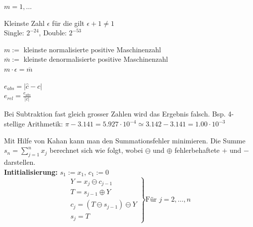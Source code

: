 \documentclass[a4paper,twocolumn]{article}
\begin{document}
	\begin{fdef}[normalisiert]
		$m = 1, \ldots$
	\end{fdef}
	
	\begin{fdef}[Maschinengenauigkeit]
		Kleinste Zahl $\epsilon$ für die gilt $\epsilon + 1 \ne 1$\\
		Single: $2^{-24}$, Double: $2^{-53}$
	\end{fdef}
	
	\begin{fmerke}
		$m := $ kleinste normalisierte positive Maschinenzahl\\
		$\overline{m} := $ kleinste denormalisierte positive Maschinenzahl\\[1mm]
		$m \cdot \epsilon = \overline{m}$
	\end{fmerke}
	
	\begin{fdef}
		$e_{abs} = |\hat c - c|$\\
		$e_{rel} = \frac{e_{abs}}{|c|}$
	\end{fdef}
	
	\begin{fdef}[Auslöschung]
		Bei Subtraktion fast gleich grosser Zahlen wird das Ergebnis falsch. Bsp. 4-stellige Arithmetik: $\pi - 3.141 = 5.927 \cdot 10^{-4} \simeq 3.142 - 3.141 = 1.00 \cdot 10^{-3}$
	\end{fdef}
	
	\begin{falgo}
		Mit Hilfe von Kahan kann man den Summationsfehler minimieren. Die Summe $s_n = \sum_{j=1}^n x_j$ berechnet
		sich wie folgt, wobei $\ominus$ und $\oplus$ fehlerbehaftete $+$ und $-$ darstellen.\\
		\textbf{Intitialisierung:} $s_1 := x_1$, $c_1 := 0$\\[-3mm]
		$$\left.
		\begin{array}{l}
			Y   = x_j     \ominus c_{j-1} 	\\
			T   = s_{j-1} \oplus Y 			\\
			c_j = (T \ominus s_{j-1}) \ominus Y\\
			s_j = T  
		\end{array} 
		\right\} \text{Für } j = 2, \ldots , n
		$$
	\end{falgo}

\end{document}
